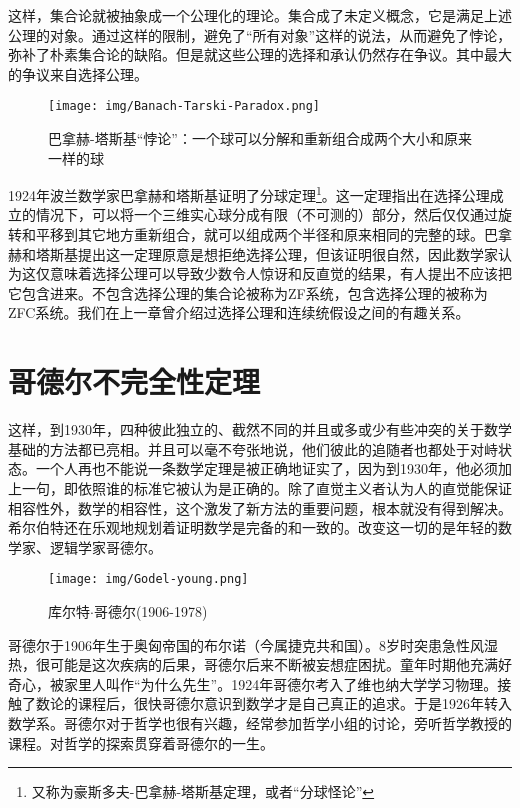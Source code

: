 \documentclass[b5paper]{ctexart}
\begin{document}
这样，集合论就被抽象成一个公理化的理论。集合成了未定义概念，它是满足上述公理的对象。通过这样的限制，避免了“所有对象”这样的说法，从而避免了悖论，弥补了朴素集合论的缺陷。但是就这些公理的选择和承认仍然存在争议。其中最大的争议来自选择公理。

\begin{figure}[htbp]
 \centering
 \texttt{[image: img/Banach-Tarski-Paradox.png]}
 \caption{巴拿赫-塔斯基“悖论”：一个球可以分解和重新组合成两个大小和原来一样的球}
 \label{fig:Banach-Tarski-Paradox}
\end{figure}

 
1924年波兰数学家巴拿赫和塔斯基证明了分球定理\footnote{又称为豪斯多夫-巴拿赫-塔斯基定理，或者“分球怪论”}。这一定理指出在选择公理成立的情况下，可以将一个三维实心球分成有限（不可测的）部分，然后仅仅通过旋转和平移到其它地方重新组合，就可以组成两个半径和原来相同的完整的球。巴拿赫和塔斯基提出这一定理原意是想拒绝选择公理，但该证明很自然，因此数学家认为这仅意味着选择公理可以导致少数令人惊讶和反直觉的结果，有人提出不应该把它包含进来。不包含选择公理的集合论被称为ZF系统，包含选择公理的被称为ZFC系统。我们在上一章曾介绍过选择公理和连续统假设之间的有趣关系。

\section{哥德尔不完全性定理}

这样，到1930年，四种彼此独立的、截然不同的并且或多或少有些冲突的关于数学基础的方法都已亮相。并且可以毫不夸张地说，他们彼此的追随者也都处于对峙状态。一个人再也不能说一条数学定理是被正确地证实了，因为到1930年，他必须加上一句，即依照谁的标准它被认为是正确的。除了直觉主义者认为人的直觉能保证相容性外，数学的相容性，这个激发了新方法的重要问题，根本就没有得到解决。希尔伯特还在乐观地规划着证明数学是完备的和一致的。改变这一切的是年轻的数学家、逻辑学家哥德尔。

\begin{wrapfigure}{L}{0.4\textwidth}
 \centering
 \texttt{[image: img/Godel-young.png]}
 \caption{库尔特$\cdot$哥德尔(1906-1978)}
 \label{fig:Godel-young}
\end{wrapfigure}

哥德尔于1906年生于奥匈帝国的布尔诺（今属捷克共和国）。8岁时突患急性风湿热，很可能是这次疾病的后果，哥德尔后来不断被妄想症困扰。童年时期他充满好奇心，被家里人叫作“为什么先生”。1924年哥德尔考入了维也纳大学学习物理。接触了数论的课程后，很快哥德尔意识到数学才是自己真正的追求。于是1926年转入数学系。哥德尔对于哲学也很有兴趣，经常参加哲学小组的讨论，旁听哲学教授的课程。对哲学的探索贯穿着哥德尔的一生。
\end{document}
